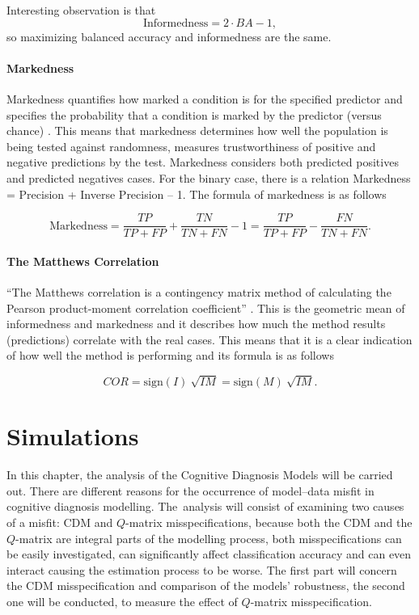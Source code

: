 \documentclass[english]{pwr_wmat_praca_dyplomowa}
\theoremstyle{plain}
\numberwithin{theorem}{chapter}
\theoremstyle{definition}
\numberwithin{theorem}{chapter}
\begin{document}
	\noindent Interesting observation is that 
	$$ \text{Informedness} = 2 \cdot BA-1,$$ 
	so maximizing balanced accuracy and informedness are the same.
	
	\subsubsection{Markedness}
	
	Markedness quantifies how marked a condition is for the specified predictor and specifies the probability that a condition is marked by the predictor (versus chance) \cite{powers2011evaluation}. This means that markedness determines how well the population is being tested against randomness, measures trustworthiness of positive and negative predictions by the test. Markedness considers both predicted positives and predicted negatives cases. For the binary case, there is a relation Markedness = Precision + Inverse Precision – 1. The formula of markedness is as follows
	
	$$ \text{Markedness} = \frac{TP}{TP + FP} + \frac{TN}{TN + FN} - 1 = \frac{TP}{TP + FP} - \frac{FN}{TN + FN}. $$
	
	\subsubsection{The Matthews Correlation}
	
	``The Matthews correlation is a contingency matrix method of calculating the Pearson product-moment correlation coefficient'' \cite{powers2011evaluation}. This is the geometric mean of informedness and markedness and it describes how much the method results (predictions) correlate with the real cases. This means that it is a clear indication of how well the method is performing and its formula is as follows
	
	$$ COR = \text{sign}(I)\ \sqrt{IM} = \text{sign}(M)\ \sqrt{IM}. $$
	
	
	\chapter{Simulations}\label{chapter:simulations}
	
	In this chapter, the analysis of the Cognitive Diagnosis Models will be carried out. There are different reasons for the occurrence of model–data misﬁt in cognitive diagnosis modelling.  The~analysis will consist of examining two causes of a misﬁt: CDM and $Q$-matrix misspeciﬁcations,  because both the CDM and the $Q$-matrix are integral parts of the modelling process, both misspeciﬁcations can be easily investigated, can significantly affect classiﬁcation accuracy and can even interact causing the estimation process to be worse. The first part will concern the CDM misspecification and comparison of the models' robustness, the second one will be conducted, to measure the effect of $Q$-matrix misspecification. 
	
\end{document}
